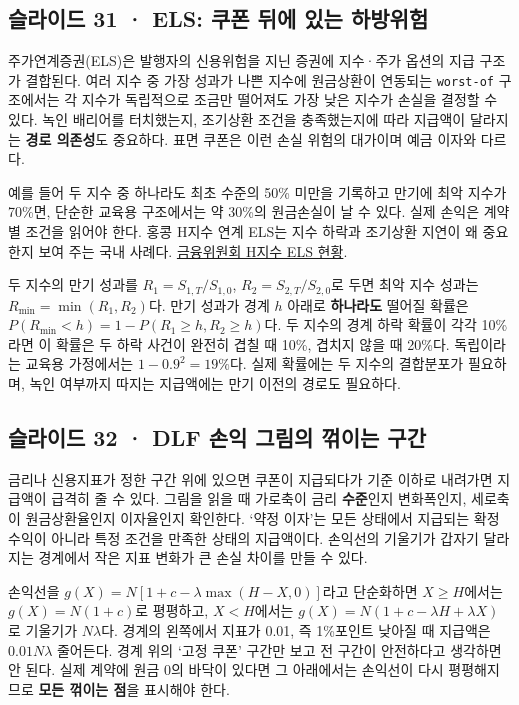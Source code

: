 \documentclass[11pt,a4paper]{article}
\begin{document}
\subsection{슬라이드 31 · ELS: 쿠폰 뒤에 있는 하방위험}
주가연계증권(ELS)은 발행자의 신용위험을 지닌 증권에 지수·주가 옵션의 지급 구조가 결합된다. 여러 지수 중 가장 성과가 나쁜 지수에 원금상환이 연동되는 \texttt{worst-of} 구조에서는 각 지수가 독립적으로 조금만 떨어져도 가장 낮은 지수가 손실을 결정할 수 있다. 녹인 배리어를 터치했는지, 조기상환 조건을 충족했는지에 따라 지급액이 달라지는 \textbf{경로 의존성}도 중요하다. 표면 쿠폰은 이런 손실 위험의 대가이며 예금 이자와 다르다.\par

예를 들어 두 지수 중 하나라도 최초 수준의 50\% 미만을 기록하고 만기에 최악 지수가 70\%면, 단순한 교육용 구조에서는 약 30\%의 원금손실이 날 수 있다. 실제 손익은 계약별 조건을 읽어야 한다. 홍콩 H지수 연계 ELS는 지수 하락과 조기상환 지연이 왜 중요한지 보여 주는 국내 사례다. \href{https://www.fsc.go.kr/po010106/81314}{금융위원회 H지수 ELS 현황}.\par

두 지수의 만기 성과를 $R_1=S_{1,T}/S_{1,0}$, $R_2=S_{2,T}/S_{2,0}$로 두면 최악 지수 성과는 $R_{\min}=\min(R_1,R_2)$다. 만기 성과가 경계 $h$ 아래로 \textbf{하나라도} 떨어질 확률은 $P(R_{\min}<h)=1-P(R_1\ge h, R_2\ge h)$다. 두 지수의 경계 하락 확률이 각각 10\%라면 이 확률은 두 하락 사건이 완전히 겹칠 때 10\%, 겹치지 않을 때 20\%다. 독립이라는 교육용 가정에서는 $1-0.9^2=19\%$다. 실제 확률에는 두 지수의 결합분포가 필요하며, 녹인 여부까지 따지는 지급액에는 만기 이전의 경로도 필요하다.\par

\subsection{슬라이드 32 · DLF 손익 그림의 꺾이는 구간}
금리나 신용지표가 정한 구간 위에 있으면 쿠폰이 지급되다가 기준 이하로 내려가면 지급액이 급격히 줄 수 있다. 그림을 읽을 때 가로축이 금리 \textbf{수준}인지 변화폭인지, 세로축이 원금상환율인지 이자율인지 확인한다. ‘약정 이자’는 모든 상태에서 지급되는 확정수익이 아니라 특정 조건을 만족한 상태의 지급액이다. 손익선의 기울기가 갑자기 달라지는 경계에서 작은 지표 변화가 큰 손실 차이를 만들 수 있다.\par

손익선을 $g(X)=N[1+c-\lambda\max(H-X,0)]$라고 단순화하면 $X\ge H$에서는 $g(X)=N(1+c)$로 평평하고, $X<H$에서는 $g(X)=N(1+c-\lambda H+\lambda X)$로 기울기가 $N\lambda$다. 경계의 왼쪽에서 지표가 0.01, 즉 1\%포인트 낮아질 때 지급액은 $0.01N\lambda$ 줄어든다. 경계 위의 ‘고정 쿠폰’ 구간만 보고 전 구간이 안전하다고 생각하면 안 된다. 실제 계약에 원금 0의 바닥이 있다면 그 아래에서는 손익선이 다시 평평해지므로 \textbf{모든 꺾이는 점}을 표시해야 한다.\par
\end{document}
